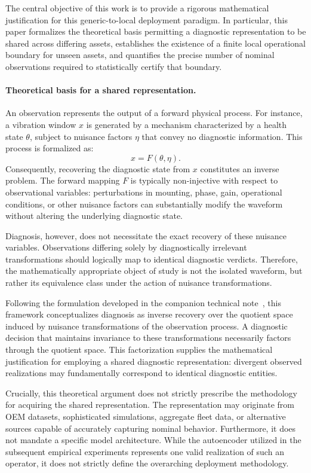 \documentclass[a4paper]{cas-sc}
\begin{document}
The central objective of this work is to provide a rigorous mathematical justification for this generic-to-local deployment paradigm. In particular, this paper formalizes the theoretical basis permitting a diagnostic representation to be shared across differing assets, establishes the existence of a finite local operational boundary for unseen assets, and quantifies the precise number of nominal observations required to statistically certify that boundary.

\paragraph{Theoretical basis for a shared representation.}
An observation represents the output of a forward physical process. For instance, a vibration window \(x\) is generated by a mechanism characterized by a health state \(\theta\), subject to nuisance factors \(\eta\) that convey no diagnostic information. This process is formalized as:
\[
    x = F(\theta,\eta).
\]
Consequently, recovering the diagnostic state from \(x\) constitutes an inverse problem. The forward mapping \(F\) is typically non-injective with respect to observational variables: perturbations in mounting, phase, gain, operational conditions, or other nuisance factors can substantially modify the waveform without altering the underlying diagnostic state.

Diagnosis, however, does not necessitate the exact recovery of these nuisance variables. Observations differing solely by diagnostically irrelevant transformations should logically map to identical diagnostic verdicts. Therefore, the mathematically appropriate object of study is not the isolated waveform, but rather its equivalence class under the action of nuisance transformations.

Following the formulation developed in the companion technical note~\citep{disanti2026quotient}, this framework conceptualizes diagnosis as inverse recovery over the quotient space induced by nuisance transformations of the observation process. A diagnostic decision that maintains invariance to these transformations necessarily factors through the quotient space. This factorization supplies the mathematical justification for employing a shared diagnostic representation: divergent observed realizations may fundamentally correspond to identical diagnostic entities.

Crucially, this theoretical argument does not strictly prescribe the methodology for acquiring the shared representation. The representation may originate from OEM datasets, sophisticated simulations, aggregate fleet data, or alternative sources capable of accurately capturing nominal behavior. Furthermore, it does not mandate a specific model architecture. While the autoencoder utilized in the subsequent empirical experiments represents one valid realization of such an operator, it does not strictly define the overarching deployment methodology.
\end{document}
